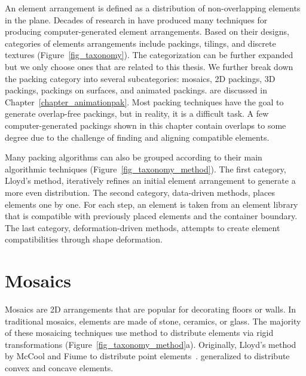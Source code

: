 \newtext
{
An element arrangement is defined as a distribution of non-overlapping elements in the plane.
Decades of research in  have produced many techniques for producing computer-generated element arrangements.
Based on their designs, categories of elements arrangements include
packings, tilings, and discrete textures (Figure~\ref{fig_taxonomy}).
The categorization can be further expanded but we only choose ones that are related to this thesis.
We further break down the packing category into several subcategories: mosaics, 2D packings, 3D packings, 
packings on surfaces, and animated packings.
 are discussed in Chapter~\ref{chapter_animationpak}. 
Most packing techniques have the goal to generate overlap-free packings, but in reality, it is a difficult task.
A few computer-generated packings shown in this chapter 
contain overlaps to some degree due to the challenge of finding and aligning compatible elements.
}

\newtext
{
\newtext
{Many packing algorithms can also be grouped according to their main algorithmic techniques} (Figure~\ref{fig_taxonomy_method}).
The first category, Lloyd's method, iteratively refines an initial element arrangement to generate a more even distribution.
The second category, data-driven methods, places elements one by one. For each step,
an element is taken from an element library that is compatible with previously placed elements and the container boundary.
The last category, deformation-driven methods, attempts to create element compatibilities through shape deformation.
}

\section{Mosaics}
\newtext
{
Mosaics are 2D arrangements that are popular for decorating floors or walls.
In traditional mosaics, elements are made of stone, ceramics, or glass.
The majority of these mosaicing techniques use  method to distribute elements
via rigid transformations (Figure~\ref{fig_taxonomy_method}a).
Originally, Lloyd's method  by \mbox{McCool} and Fiume to distribute point elements~\cite{McCool1992}.
 generalized to distribute convex and concave elements.
}

